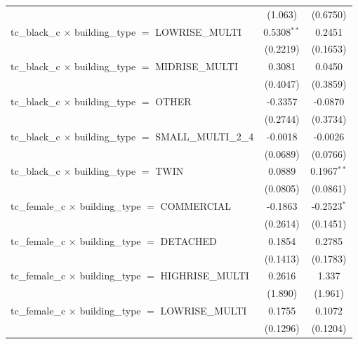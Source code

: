 \begin{tabular}{lcc}
                                                                       & (1.063)        & (0.6750)\\   
   tc\_black\_c $\times$ building\_type $=$ LOWRISE\_MULTI             & 0.5308$^{**}$  & 0.2451\\   
                                                                       & (0.2219)       & (0.1653)\\   
   tc\_black\_c $\times$ building\_type $=$ MIDRISE\_MULTI             & 0.3081         & 0.0450\\   
                                                                       & (0.4047)       & (0.3859)\\   
   tc\_black\_c $\times$ building\_type $=$ OTHER                      & -0.3357        & -0.0870\\   
                                                                       & (0.2744)       & (0.3734)\\   
   tc\_black\_c $\times$ building\_type $=$ SMALL\_MULTI\_2\_4         & -0.0018        & -0.0026\\   
                                                                       & (0.0689)       & (0.0766)\\   
   tc\_black\_c $\times$ building\_type $=$ TWIN                       & 0.0889         & 0.1967$^{**}$\\   
                                                                       & (0.0805)       & (0.0861)\\   
   tc\_female\_c $\times$ building\_type $=$ COMMERCIAL                & -0.1863        & -0.2523$^{*}$\\   
                                                                       & (0.2614)       & (0.1451)\\   
   tc\_female\_c $\times$ building\_type $=$ DETACHED                  & 0.1854         & 0.2785\\   
                                                                       & (0.1413)       & (0.1783)\\   
   tc\_female\_c $\times$ building\_type $=$ HIGHRISE\_MULTI           & 0.2616         & 1.337\\   
                                                                       & (1.890)        & (1.961)\\   
   tc\_female\_c $\times$ building\_type $=$ LOWRISE\_MULTI            & 0.1755         & 0.1072\\   
                                                                       & (0.1296)       & (0.1204)\\   

\end{tabular}
